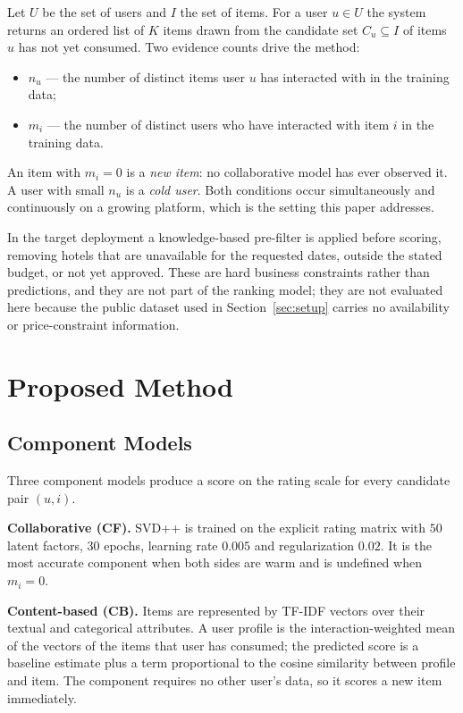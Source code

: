 \documentclass[conference]{IEEEtran}
\begin{document}
Let $U$ be the set of users and $I$ the set of items. For a user
$u \in U$ the system returns an ordered list of $K$ items drawn from
the candidate set $C_u \subseteq I$ of items $u$ has not yet
consumed. Two evidence counts drive the method:

\begin{itemize}
\item $n_u$ --- the number of distinct items user $u$ has interacted
with in the training data;
\item $m_i$ --- the number of distinct users who have interacted with
item $i$ in the training data.
\end{itemize}

An item with $m_i = 0$ is a \emph{new item}: no collaborative model
has ever observed it. A user with small $n_u$ is a \emph{cold user}.
Both conditions occur simultaneously and continuously on a growing
platform, which is the setting this paper addresses.

In the target deployment a knowledge-based pre-filter is applied
before scoring, removing hotels that are unavailable for the
requested dates, outside the stated budget, or not yet approved.
These are hard business constraints rather than predictions, and they
are not part of the ranking model; they are not evaluated here
because the public dataset used in Section~\ref{sec:setup} carries no
availability or price-constraint information.

\section{Proposed Method}

\subsection{Component Models}

Three component models produce a score on the rating scale for every
candidate pair $(u,i)$.

\textbf{Collaborative (CF).} SVD++ \cite{koren2008} is trained on the
explicit rating matrix with $50$ latent factors, $30$ epochs,
learning rate $0.005$ and regularization $0.02$. It is the most
accurate component when both sides are warm and is undefined when
$m_i = 0$.

\textbf{Content-based (CB).} Items are represented by TF-IDF vectors
over their textual and categorical attributes. A user profile is the
interaction-weighted mean of the vectors of the items that user has
consumed; the predicted score is a baseline estimate plus a term
proportional to the cosine similarity between profile and item. The
component requires no other user's data, so it scores a new item
immediately.
\end{document}
